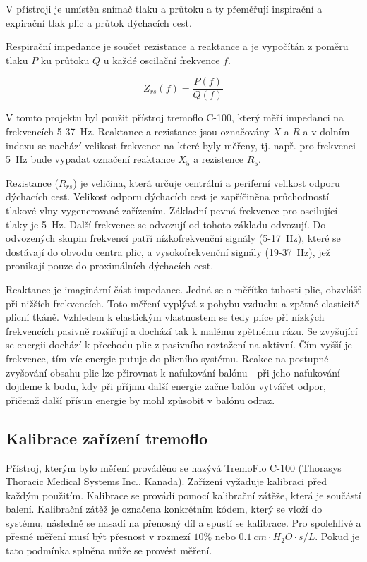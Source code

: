 V přístroji je umístěn snímač tlaku a průtoku a ty přeměřují inspirační a expirační tlak plic a průtok dýchacích cest. 

Respirační impedance je součet rezistance a reaktance a je vypočítán z poměru tlaku  $P$ ku průtoku $Q$ u každé oscilační frekvence $f$. \cite{Vlcek2018}

\begin{equation}
	\label{rce:2}
	Z_{rs}(f) = \frac{P(f)}{Q(f)}
\end{equation}


V tomto projektu byl použit přístroj tremoflo C-100, který měří impedanci na frekvencích 5-37~Hz. Reaktance a rezistance jsou označovány $X$ a $R$ a v dolním indexu se nachází velikost frekvence na které byly měřeny, tj. např. pro frekvenci 5~Hz bude vypadat označení reaktance $X_5$ a rezistence $R_5$. 

Rezistance ($R_{rs}$) je veličina, která určuje centrální a periferní velikost odporu dýchacích cest. Velikost odporu dýchacích cest je zapříčiněna průchodností tlakové vlny vygenerované zařízením. Základní pevná frekvence pro oscilující tlaky je 5~Hz. Další frekvence se odvozují od tohoto základu odvozují. Do odvozených skupin frekvencí patří nízkofrekvenční signály (5-17~Hz), které se dostávají do obvodu centra plic, a vysokofrekvenční signály (19-37~Hz), jež pronikají pouze do proximálních dýchacích cest. 

Reaktance je imaginární část impedance. Jedná se o měřítko tuhosti plic, obzvlášť při nižších frekvencích. Toto měření vyplývá z pohybu vzduchu  a zpětné elasticitě plicní tkáně. Vzhledem k elastickým vlastnostem se tedy plíce při nízkých frekvencích pasivně rozšiřují a dochází tak k malému zpětnému rázu. Se zvyšující se energii dochází k přechodu plic z pasivního roztažení na aktivní. Čím vyšší je frekvence, tím víc energie putuje do plicního systému. Reakce na postupné zvyšování obsahu plic lze přirovnat k nafukování balónu - při jeho nafukování dojdeme k bodu, kdy při příjmu další energie začne balón vytvářet odpor, přičemž další přísun energie by mohl způsobit v balónu odraz.


\subsection{Kalibrace zařízení tremoflo}\label{kalibrace}
Přístroj, kterým bylo měření prováděno se nazývá TremoFlo C-100 (Thorasys Thoracic Medical Systems Inc., Kanada). Zařízení vyžaduje kalibraci před každým použitím. Kalibrace se provádí pomocí kalibrační zátěže, která je součástí balení. Kalibrační zátěž je označena konkrétním kódem, který se vloží do systému, následně  se nasadí na přenosný díl a spustí se kalibrace. Pro spolehlivé a přesné měření musí být přesnost 
v rozmezí $10\%$ nebo $\SI{0,1}{cm \cdot H_{2}O \cdot s/L}$. Pokud je tato podmínka splněna může se provést měření. \cite{Vlcek2018}

